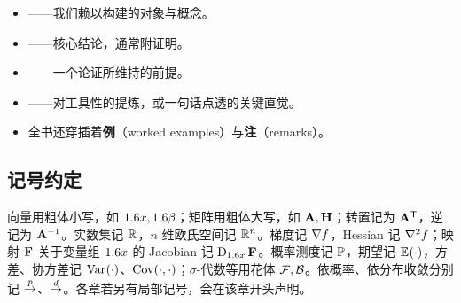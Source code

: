 \documentclass[oneside,fontset=macnew,UTF8]{ctexbook}
\begin{document}
\begin{itemize}
    \item {}——我们赖以构建的对象与概念。
    \item {}——核心结论，通常附证明。
    \item {}——一个论证所维持的前提。
    \item {}——对工具性的提炼，或一句话点透的关键直觉。
    \item 全书还穿插着\textbf{例}（worked examples）与\textbf{注}（remarks）。
\end{itemize}

\subsection*{记号约定}

向量用粗体小写，如 $1.6{x},1.6{\beta}$；矩阵用粗体大写，如 $\mathbf{A},\mathbf{H}$；转置记为 $\mathbf{A}^{\mathsf{T}}$，逆记为 ${\mathbf{A}}^{-1}$。实数集记 $\mathbb{R}$，$n$ 维欧氏空间记 $\mathbb{R}^n$。梯度记 $\nabla f$，Hessian 记 $\nabla^2 f$；映射 $\mathbf{F}$ 关于变量组 $1.6 x$ 的 Jacobian 记 $\operatorname{D}_{1.6 x}\mathbf{F}$。概率测度记 $\mathbb{P}$，期望记 $\mathbb{E}_{}\!\left(\cdot\right)$，方差、协方差记 $\operatorname{Var}_{}\!\left(\cdot\right)$、$\operatorname{Cov}\!\left(\cdot,\cdot\right)$；$\sigma$-代数等用花体 $\mathcal{F},\mathcal{B}$。依概率、依分布收敛分别记 $\overset{p}{\to}$、$\overset{d}{\to}$。各章若另有局部记号，会在该章开头声明。

\newpage

\setcounter{tocdepth}{1}
\tableofcontents
\newpage
\end{document}
